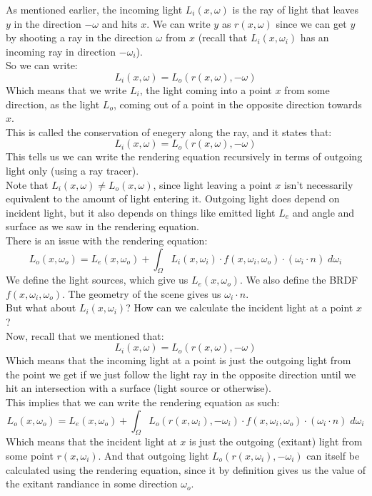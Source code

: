 \documentclass[12pt]{article}
\begin{document}
As mentioned earlier, the incoming light $L_i(x, \omega)$
is the ray of light that leaves $y$ in the direction $-\omega$
and hits $x$.
We can write $y$ as $r(x,\omega)$
since we can get $y$ by shooting a ray in the direction
$\omega$ from $x$ (recall that $L_i(x, \omega_i)$
has an incoming ray in direction $-\omega_i$). \\
So we can write:
\[ L_i(x, \omega) = L_o(r(x, \omega), -\omega) \]
Which means that we write $L_i$,
the light coming into a point $x$ from some direction,
as the light $L_o$, coming out of a point in
the opposite direction towards $x$. \\

This is called the conservation of enegery along the ray,
and it states that:
\[ L_i(x, \omega) = L_o(r(x, \omega), -\omega) \]
This tells us we can write the rendering equation recursively
in terms of outgoing light only (using a ray tracer). \\

Note that $L_i(x, \omega) \neq L_o(x, \omega)$,
since light leaving a point $x$ isn't
necessarily equivalent to the amount of light
entering it.
Outgoing light does depend on incident light,
but it also depends on things like emitted light $L_e$
and angle and surface as we saw in 
the rendering equation. \\

There is an issue with the rendering equation:
\[ L_{o}(x, \omega_o)
= L_{e}(x, \omega_o)
+ \int_\Omega L_{i}(x, \omega_i) \cdot
f(x, \omega_i, \omega_o) \cdot
(\omega_i \cdot n) \; d\omega_i \]
We define the light sources, 
which give us $L_{e}(x, \omega_o)$.
We also define the BRDF $f(x, \omega_i, \omega_o)$.
The geometry of the scene gives us $\omega_i \cdot n$. \\
But what about $L_{i}(x, \omega_i)$?
How can we calculate the incident light
at a point $x$? \\

Now, recall that we mentioned that:
\[ L_i(x, \omega) = L_o(r(x, \omega), -\omega) \]
Which means that the incoming light at a point
is just the outgoing light from the point
we get if we just follow the light ray
in the opposite direction until we hit
an intersection with a surface (light source
or otherwise). \\
This implies that we can write the rendering
equation as such:
\[ L_{o}(x, \omega_o)
= L_{e}(x, \omega_o)
+ \int_\Omega L_o(r(x, \omega_i), -\omega_i)  \cdot
f(x, \omega_i, \omega_o) \cdot
(\omega_i \cdot n) \; d\omega_i \]
Which means that the incident light at $x$
is just the outgoing (exitant) light 
from some point $r(x, \omega_i)$.
And that outgoing light $L_o(r(x, \omega_i), -\omega_i)$
can itself be calculated using the rendering
equation, since it by definition
gives us the value of the exitant randiance
in some direction $\omega_o$. \\
\end{document}

